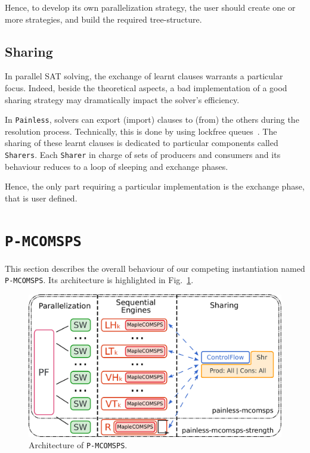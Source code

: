 \documentclass[conference]{IEEEtran}
\newcommand{\painless}[0]{\texttt{Painless}\xspace}
\newcommand{\pmcomsps}[0]{\texttt{P-MCOMSPS}\xspace}
\begin{document}
Hence, to develop its own parallelization strategy, the user should create one
or more strategies, and build  the required tree-structure.

\subsection{Sharing}

In parallel SAT solving, the exchange of learnt clauses warrants a particular
focus. Indeed, beside the theoretical aspects, a bad implementation of a good
sharing strategy may dramatically impact the solver's efficiency.

In \painless, solvers can export (import) clauses to (from) the others during
the resolution process. Technically, this is done by using lockfree
queues~\cite{lockfree-queues_96}. The sharing of these learnt clauses is
dedicated to particular components called \texttt{Sharers}. Each
\texttt{Sharer} in charge of sets of producers and consumers and its behaviour
reduces to a loop of sleeping and exchange phases. 

Hence, the only part requiring a particular implementation is the exchange
phase, that is user defined. 

\section{\pmcomsps}
\label{sec:instance1}

This section describes the overall behaviour of our competing instantiation
named \pmcomsps. Its architecture is highlighted in Fig.~\ref{fig:instance}.

\begin{figure}[t]
   \centering
   \includegraphics[scale=0.3]{figures/instance.pdf}
   \caption{Architecture of \pmcomsps.}
   \label{fig:instance}
\end{figure}
\end{document}
